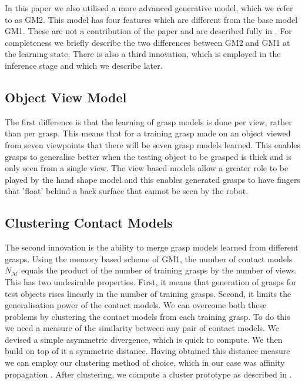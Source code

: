 
In this paper we also utilised a more advanced generative model, which we refer to as GM2. This model has four features which are different from the base model GM1. These are not a contribution of the paper and are described fully in \cite{kopicki2019}. For completeness we briefly describe the two differences between GM2 and GM1 at the learning state. There is also a third innovation, which is employed in the inference stage and which we describe later.

\subsection{Object View Model}\label{sec:representations.object}
The first difference is that the learning of grasp models is done per view, rather than per grasp. This means that for a training grasp made on an object viewed from seven viewpoints that there will be seven grasp models learned. This enables grasps to generalise better when the testing object to be grasped is thick and is only seen from a single view. The view based models allow a greater role to be played by the hand shape model and this enables generated grasps to have fingers that 'float' behind a back surface that cannot be seen by the robot.

\subsection{Clustering Contact Models}\label{sec:learning.clustering}

The second innovation is the ability to merge grasp models learned from different grasps. Using the memory based scheme of GM1, the number of contact models $N_{\mathcal{M}}$ equals the product of the number of training grasps by the number of views. This has two undesirable properties. First, it means that generation of grasps for test objects rises linearly in the number of training grasps. Second, it limits the generalisation power of the contact models. We can overcome both these problems by clustering the contact models from each training grasp. To do this we need a measure of the similarity between any pair of contact models. We devised a simple asymmetric divergence, which is quick to compute. We then build on top of it a symmetric distance. Having obtained this distance measure we can employ our clustering method of choice, which in our case was affinity propagation \cite{frey2007clustering}. After clustering, we compute a cluster prototype as described in \cite{kopicki2019}.
